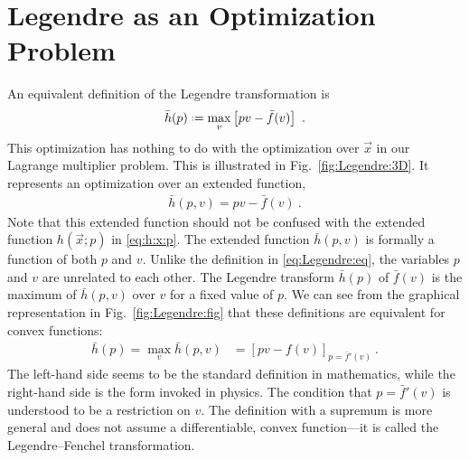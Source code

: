 \section{Legendre as an Optimization Problem}

An equivalent definition of the Legendre transformation is
\begin{align}
    \bar h(p) \defeq \max_{v}\left[pv-\bar f(v)\right] \ .
\end{align}
This optimization has nothing to do with the optimization over $\vec{x}$ in our Lagrange multiplier problem.
% 
This is illustrated in Fig.~\ref{fig:Legendre:3D}. It represents an optimization over an extended function, 
\begin{align}
 \bar h(p,v) = pv - \bar f(v) \ .   
\end{align}
Note that this extended function should not be confused with the extended function $h(\vec{x};p)$ in \eqref{eq:h:x:p}. The extended function $\bar h(p,v)$ is formally a function of both $p$ and $v$. 
% 
Unlike the definition in \eqref{eq:Legendre:eq}, the variables $p$ and $v$ are unrelated to each other. 
% 
The Legendre transform $\bar h(p)$ of $\bar f(v)$ is the maximum of $\bar h(p,v)$ over $v$ for a fixed value of $p$.
% 
We can see from the graphical representation in Fig.~\ref{fig:Legendre:fig} that these definitions are equivalent for convex functions:
\begin{align}
    \bar h(p) =
    \max_{v} \bar h(p,v)
    &=
    \left[pv-f(v)\right]_{p=\bar f'(v)} \ .
\end{align}
The left-hand side seems to be the standard definition in mathematics, while the right-hand side is the form invoked in physics. The condition that $p=\bar f'(v)$ is understood to be a restriction on $v$. The definition with a supremum is more general and does not assume a differentiable, convex function---it is called the Legendre--Fenchel transformation.

